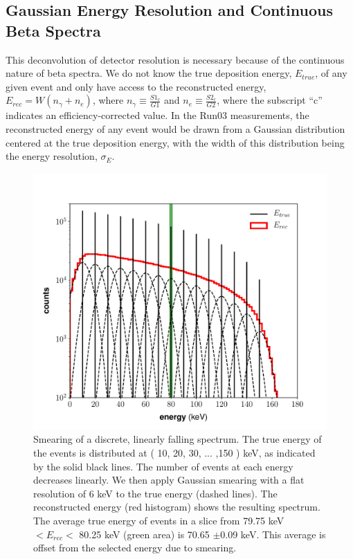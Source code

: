 \subsection{Gaussian Energy Resolution and Continuous Beta Spectra}
This deconvolution of detector resolution is necessary because of the continuous nature of beta spectra. We do not know the true deposition energy, $E_{true}$, of any given event and only have access to the reconstructed energy, $E_{rec}=W\left(n_{\gamma}+n_{e}\right)$, where $n_{\gamma}\equiv \frac{S1_c}{G1}$ and $n_{e}\equiv \frac{S2_c}{G2}$, where the subscript ``c'' indicates an efficiency-corrected value. In the Run03 measurements, the reconstructed energy of any event would be drawn from a Gaussian distribution centered at the true deposition energy, with the width of this distribution being the energy resolution, $\sigma_{E}$. 
\begin{figure}[h!]
\centering
\includegraphics[width=\textwidth]{Figures/toy_smearing.pdf}
\caption{Smearing of a discrete, linearly falling spectrum. The true energy of the events is distributed at ( 10, 20, 30, ... ,150 ) keV, as indicated by the solid black lines. The number of events at each energy decreases linearly. We then apply Gaussian smearing with a flat resolution of 6 keV to the true energy (dashed lines). The reconstructed energy (red histogram) shows the resulting spectrum. The average true energy of events in a slice from 79.75 keV $<E_{rec}<$ 80.25 keV (green area) is 70.65 $\pm$0.09 keV. This average is offset from the selected energy due to smearing.}
\label{fig:toysmear}
\end{figure}

